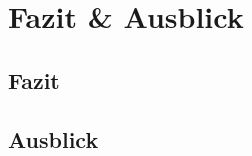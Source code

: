 \section{Fazit \& Ausblick}
\label{sec:schluss}

\subsection{Fazit}
\label{sec:fazit}

\lipsum[6-8]

\subsection{Ausblick}
\label{sec:ausblick}

\lipsum[9-10]
